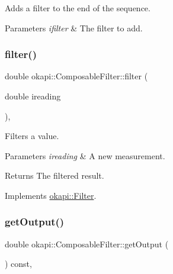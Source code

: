 Adds a filter to the end of the sequence.


\begin{DoxyParams}{Parameters}
{\em ifilter} & The filter to add. \\
\hline
\end{DoxyParams}
\mbox{\label{classokapi_1_1ComposableFilter_a76925f04dcd186b249e5bfb169f27992}} 
\subsubsection{\texorpdfstring{filter()}{filter()}}
{\footnotesize\ttfamily double okapi\+::\+Composable\+Filter\+::filter (\begin{DoxyParamCaption}\item[{double}]{ireading }\end{DoxyParamCaption})\hspace{0.3cm}{\ttfamily [override]}, {\ttfamily [virtual]}}

Filters a value.


\begin{DoxyParams}{Parameters}
{\em ireading} & A new measurement. \\
\hline
\end{DoxyParams}
\begin{DoxyReturn}{Returns}
The filtered result. 
\end{DoxyReturn}


Implements \mbox{\hyperlink{classokapi_1_1Filter_a7c2ea0b64b37b688900189856d58da15}{okapi\+::\+Filter}}.

\mbox{\label{classokapi_1_1ComposableFilter_a2d54899ce84c463af2f22cfbf36c7c7c}} 
\subsubsection{\texorpdfstring{getOutput()}{getOutput()}}
{\footnotesize\ttfamily double okapi\+::\+Composable\+Filter\+::get\+Output (\begin{DoxyParamCaption}{ }\end{DoxyParamCaption}) const\hspace{0.3cm}{\ttfamily [override]}, {\ttfamily [virtual]}}

